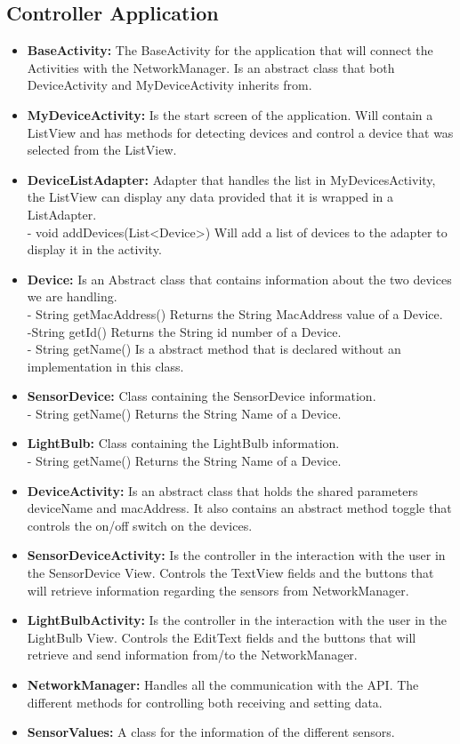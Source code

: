 \documentclass[a4paper]{article}
\begin{document}
	\subsection{Controller Application}
	\begin{itemize}
		\item{\textbf{BaseActivity:}} 
		The BaseActivity for the application that will connect the Activities with the NetworkManager. Is an abstract class that both DeviceActivity and MyDeviceActivity inherits from.
		\item{\textbf{MyDeviceActivity:}} 
		Is the start screen of the application. Will contain a ListView and has methods for detecting devices and control a device that was selected from the ListView.
		\item{\textbf{DeviceListAdapter:}} 
		Adapter that handles the list in MyDevicesActivity, the ListView can display any data provided that it is wrapped in a ListAdapter.\\ 
        - void addDevices(List<Device>) Will add a list of devices to the adapter to display it in the activity.
		\item{\textbf{Device:}} 
		Is an Abstract class that contains information about the two devices we are handling. \\
        - String getMacAddress() Returns the String MacAddress value of a Device.\\
        -String getId() Returns the String id number of a Device.\\
        - String getName() Is a abstract method that is declared without an implementation in this class.
		\item{\textbf{SensorDevice:}} 
		Class containing the SensorDevice information.\\
        - String getName() Returns the String Name of a Device.
		\item{\textbf{LightBulb:}}
		Class containing the LightBulb information.\\
        - String getName() Returns the String Name of a Device.
		\item{\textbf{DeviceActivity:}} 
		Is an abstract class that holds the shared parameters deviceName and macAddress. It also contains an abstract method toggle that controls the on/off switch on the devices.
		\item{\textbf{SensorDeviceActivity:}} 
		Is the controller in the interaction with the user in the SensorDevice View. Controls the TextView fields and the buttons that will retrieve information regarding the sensors from NetworkManager.
		\item{\textbf{LightBulbActivity:}} 
		Is the controller in the interaction with the user in the LightBulb View. Controls the EditText fields and the buttons that will retrieve and send information from/to the NetworkManager.
		
		\item{\textbf{NetworkManager:}} 
		Handles all the communication with the API. The different methods for controlling both receiving and setting data.
		\item{\textbf{SensorValues:}} 
		A class for the information of the different sensors.
		
	\end{itemize}
\end{document}
